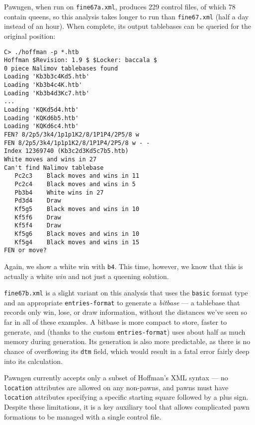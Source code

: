\documentclass[11pt]{article}
\begin{document}
Pawngen, when run on {\tt fine67a.xml}, produces 229 control files, of
which 78 contain queens, so this analysis takes longer to run than
{\tt fine67.xml} (half a day instead of an hour).  When complete, its
output tablebases can be queried for the original position:

\begin{verbatim}
C> ./hoffman -p *.htb
Hoffman $Revision: 1.9 $ $Locker: baccala $
0 piece Nalimov tablebases found
Loading 'Kb3b3c4Kd5.htb'
Loading 'Kb3b4c4K.htb'
Loading 'Kb3b4d3Kc7.htb'
...
Loading 'KQKd5d4.htb'
Loading 'KQKd6b5.htb'
Loading 'KQKd6c4.htb'
FEN? 8/2p5/3k4/1p1p1K2/8/1P1P4/2P5/8 w
FEN 8/2p5/3k4/1p1p1K2/8/1P1P4/2P5/8 w - -
Index 12369740 (Kb3c2d3Kd5c7b5.htb)
White moves and wins in 27
Can't find Nalimov tablebase
   Pc2c3    Black moves and wins in 11
   Pc2c4    Black moves and wins in 5
   Pb3b4    White wins in 27
   Pd3d4    Draw
   Kf5g5    Black moves and wins in 10
   Kf5f6    Draw
   Kf5f4    Draw
   Kf5g6    Black moves and wins in 10
   Kf5g4    Black moves and wins in 15
FEN or move?
\end{verbatim}

Again, we show a white win with {\tt b4}.  This time, however, we know
that this is actually a white {\it win} and not just a queening
solution.

{\tt fine67b.xml} is a slight variant on this analysis that uses the
{\tt basic} format type and an appropriate {\tt entries-format} to
generate a {\it bitbase} --- a tablebase that records only win, lose,
or draw information, without the distances we've seen so far in all of
these examples.  A bitbase is more compact to store, faster to
generate, and (thanks to the custom {\tt entries-format}) uses about
half as much memory during generation.  Its generation is also more
predictable, as there is no chance of overflowing its {\tt dtm} field,
which would result in a fatal error fairly deep into its calculation.

Pawngen currently accepts only a subset of Hoffman's XML syntax --- no
{\tt location} attributes are allowed on any non-pawns, and pawns must
have {\tt location} attributes specifying a specific starting square
followed by a plus sign.  Despite these limitations, it is a key
auxiliary tool that allows complicated pawn formations to be managed
with a single control file.
\end{document}
